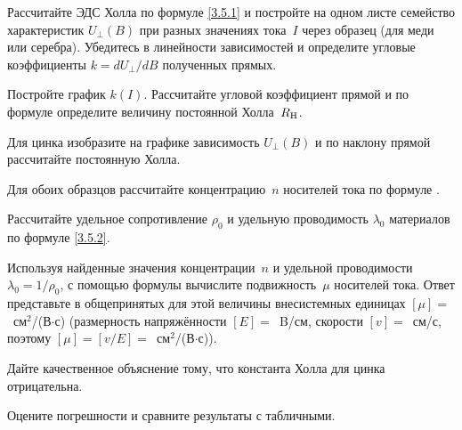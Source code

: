 \begin{lab:task}
\item Рассчитайте ЭДС Холла по формуле \eqref{3.5.1} и постройте на одном листе
семейство характеристик $U_{\perp}(B)$ при разных значениях тока~$I$ через
образец (для меди или серебра). 
Убедитесь в линейности зависимостей и определите угловые 
коэффициенты $k=dU_{\perp}/dB$ полученных прямых.

\item Постройте график $k(I)$. Рассчитайте угловой коэффициент прямой 
и по формуле  определите величину постоянной Холла~$R_{\rm H}$.

\item Для цинка изобразите на графике зависимость $U_{\perp}(B)$ и по наклону 
прямой рассчитайте постоянную Холла.

\item Для обоих образцов рассчитайте концентрацию~$n$ носителей тока по формуле
.

\item Рассчитайте удельное сопротивление $\rho_0$ и удельную 
проводимость $\lambda_0$ материалов по формуле \eqref{3.5.2}.

\item Используя найденные значения концентрации~$n$ и удельной проводимости
$\lambda_0=1/\rho_0$, с помощью формулы  вычислите 
подвижность~$\mu$ носителей тока. Ответ представьте в общепринятых для этой величины 
внесистемных единицах $[\mu]=$~см$^2$/(В$\cdot$с)
(размерность напряжённости $[E]=$~B/см, скорости $[v]=$~см/с,
поэтому $[\mu]=[v/E]=$~см$^2$/(В$\cdot$с)).

\item Дайте качественное объяснение тому, что константа Холла для
цинка отрицательна.

\item Оцените погрешности и сравните результаты с табличными.

\end{lab:task}



